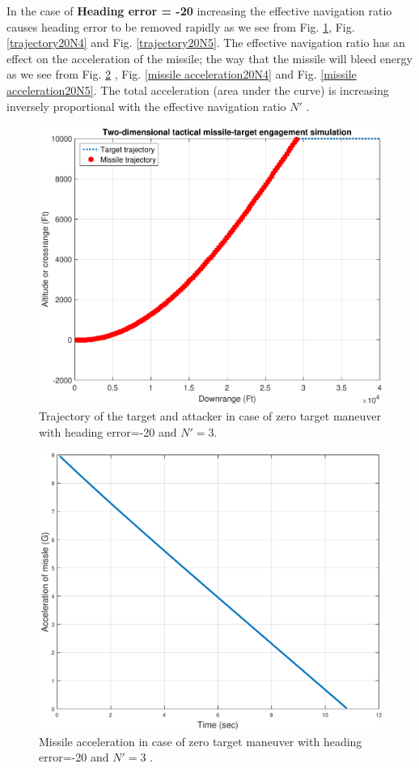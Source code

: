 In the case of \textbf{Heading error = -20} increasing the effective navigation ratio causes heading error to be removed rapidly as we see from  Fig. \ref{trajectory20N3}, Fig. \ref{trajectory20N4} and Fig. \ref{trajectory20N5}. The effective navigation ratio has an effect on the acceleration of the missile; the way that the missile will bleed energy as we see from Fig. \ref{missile acceleration20N3} , Fig. \ref{missile acceleration20N4} and Fig. \ref{missile acceleration20N5}. The total acceleration (area under the curve) is increasing inversely proportional with the effective navigation ratio $N'$ .


\begin{figure}[H]
	\centering
	\includegraphics[scale = 0.48]{fig/trajectoryXNT0HE20N3.pdf}
	\caption{Trajectory of the target and attacker in case of zero target maneuver with heading error=-20 and $N'=3$.}
	\label{trajectory20N3}
\end{figure}

\begin{figure}[H]
	\centering
	\includegraphics[scale = 0.48]{fig/MissileAccelerationXNT0HE20N3.pdf}
	\caption{Missile acceleration in case of zero target maneuver with heading error=-20 and $N'=3$ .}
	\label{missile acceleration20N3}
\end{figure}


